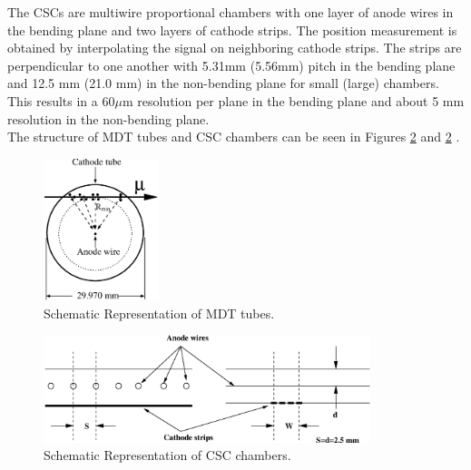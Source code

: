 \indent The CSCs are multiwire proportional chambers with one layer of anode wires in the bending plane and two layers of cathode strips. The position measurement is obtained by interpolating the signal on neighboring cathode strips. The strips are perpendicular to one another with 5.31mm (5.56mm) pitch in the bending plane and 12.5 mm (21.0 mm) in the non-bending plane for small (large) chambers.   This results in a $60 \mu$m resolution per plane in the bending plane and about 5 mm resolution in the non-bending plane. \\ %

\indent The structure of MDT tubes and CSC chambers can be seen in Figures \ref{LHC:fig:MDT} and \ref{LHC:fig:MDT} . \\

\begin{figure}[h!]
\centering
\includegraphics[width=0.30\textwidth, angle=0]{figures/LHC_ATLAS/MDT_tube_cross_section.eps}
\caption[~Schematic Representation of MDT tubes]{ Schematic Representation of MDT tubes.\cite{ATLAS_JINST} \label{LHC:fig:MDT}}
\end{figure}

\begin{figure}[h!]
\centering
\includegraphics[width=0.85\textwidth, angle=0]{figures/LHC_ATLAS/CSC_structure.eps}
\caption[~Schematic Representation of CSC chambers]{ Schematic Representation of CSC chambers.\cite{ATLAS_JINST} \label{LHC:fig:MDT}}
\end{figure}

